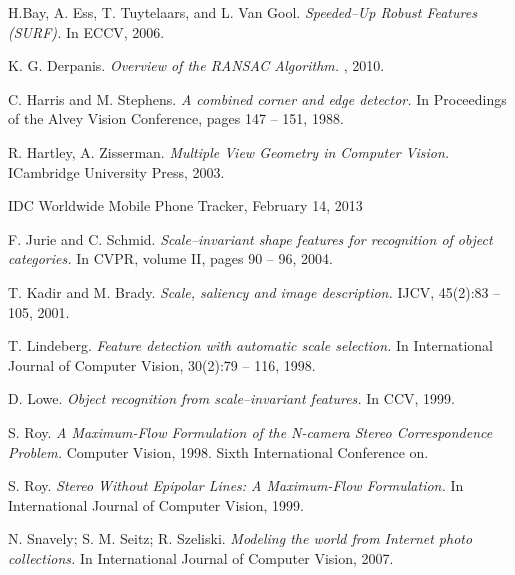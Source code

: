 
\def\bibname{Bibliography}
\begin{thebibliography}{99}
\addcontentsline{toc}{chapter}{\bibname}


  {\sc  H.Bay, A. Ess, T. Tuytelaars, and L. Van Gool.}
  \emph{Speeded–Up Robust Features (SURF).}
  In ECCV, 2006.

  {\sc K. G. Derpanis.} 
  \emph{Overview of the RANSAC Algorithm.}
  , 2010.

  {\sc C. Harris and M. Stephens.} 
  \emph{A combined corner and edge detector.}
  In Proceedings of the Alvey Vision Conference, pages 147 – 151, 1988.

  {\sc  R. Hartley, A. Zisserman.}
  \emph{Multiple View Geometry in Computer Vision.}
  ICambridge University Press, 2003.

  IDC Worldwide Mobile Phone Tracker, February 14, 2013

  {\sc F. Jurie and C. Schmid.} 
  \emph{Scale–invariant shape features for recognition of object categories.}
  In CVPR, volume II, pages 90 – 96, 2004.

  {\sc T. Kadir and M. Brady.} 
  \emph{Scale, saliency and image description.}
  IJCV, 45(2):83 – 105, 2001.
  
  {\sc T. Lindeberg.} 
  \emph{Feature detection with automatic scale selection.}
  In International Journal of Computer Vision, 30(2):79 – 116, 1998.

  {\sc D. Lowe.} 
  \emph{Object recognition from scale–invariant features.}
  In CCV, 1999.

  {\sc S. Roy.} 
  \emph{A Maximum-Flow Formulation of the N-camera Stereo Correspondence Problem.}
  Computer Vision, 1998. Sixth International Conference on.

  {\sc S. Roy.} 
  \emph{Stereo Without Epipolar Lines: A Maximum-Flow Formulation.}
  In International Journal of Computer Vision, 1999.


  {\sc N. Snavely; S. M. Seitz; R. Szeliski.} 
  \emph{Modeling the world from Internet photo collections.}
  In International Journal of Computer Vision, 2007.


\end{thebibliography}
